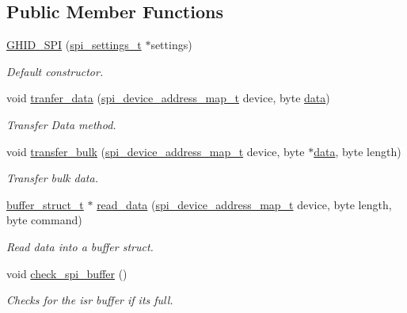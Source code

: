 \subsection*{\-Public \-Member \-Functions}
\begin{DoxyCompactItemize}
\item 
\hyperlink{class_g_h_i_d___s_p_i_a71372a4a455b9ef0a27026f386d88c8d}{\-G\-H\-I\-D\-\_\-\-S\-P\-I} (\hyperlink{structspi__settings__t}{spi\-\_\-settings\-\_\-t} $\ast$settings)
\begin{DoxyCompactList}\small\item\em \-Default constructor. \end{DoxyCompactList}\item 
void \hyperlink{class_g_h_i_d___s_p_i_a9cc5cdee38071b54566c57783443b17b}{tranfer\-\_\-data} (\hyperlink{_g_h_i_d___s_p_i_8h_a9d51766baec84fc8f27a377fb7a1ace7}{spi\-\_\-device\-\_\-address\-\_\-map\-\_\-t} device, byte \hyperlink{masstorage_8h_afb87d045bbf32b236fc425efe02bdc7b}{data})
\begin{DoxyCompactList}\small\item\em \-Transfer \-Data method. \end{DoxyCompactList}\item 
void \hyperlink{class_g_h_i_d___s_p_i_adb5f0f373d1c6f3da3bb5323c9ad3ec1}{transfer\-\_\-bulk} (\hyperlink{_g_h_i_d___s_p_i_8h_a9d51766baec84fc8f27a377fb7a1ace7}{spi\-\_\-device\-\_\-address\-\_\-map\-\_\-t} device, byte $\ast$\hyperlink{masstorage_8h_afb87d045bbf32b236fc425efe02bdc7b}{data}, byte length)
\begin{DoxyCompactList}\small\item\em \-Transfer bulk data. \end{DoxyCompactList}\item 
\hyperlink{structbuffer__struct__t}{buffer\-\_\-struct\-\_\-t} $\ast$ \hyperlink{class_g_h_i_d___s_p_i_a1112a6f569a6e570f166a2976f69291e}{read\-\_\-data} (\hyperlink{_g_h_i_d___s_p_i_8h_a9d51766baec84fc8f27a377fb7a1ace7}{spi\-\_\-device\-\_\-address\-\_\-map\-\_\-t} device, byte length, byte command)
\begin{DoxyCompactList}\small\item\em \-Read data into a buffer struct. \end{DoxyCompactList}\item 
void \hyperlink{class_g_h_i_d___s_p_i_a81d883b745c3848fb920df0ceb76ab08}{check\-\_\-spi\-\_\-buffer} ()
\begin{DoxyCompactList}\small\item\em \-Checks for the isr buffer if its full. \end{DoxyCompactList}\end{DoxyCompactItemize}
